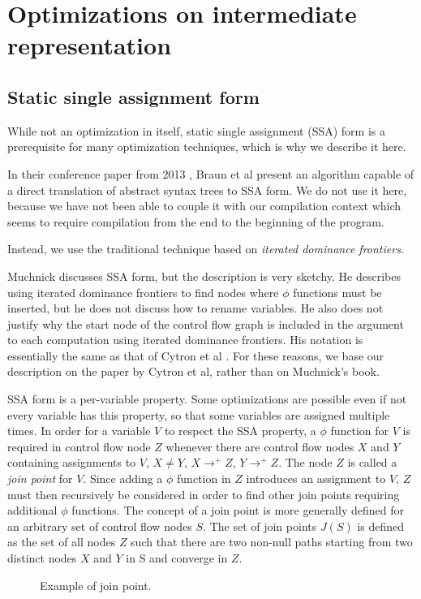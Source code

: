 \chapter{Optimizations on intermediate representation}

\section{Static single assignment form}

While not an optimization in itself, static single assignment (SSA)
form is a prerequisite for many optimization techniques, which is why
we describe it here. 

In their conference paper from 2013
\cite{Braun:2013:SEC:2450247.2450258}, Braun et al present an
algorithm capable of a direct translation of abstract syntax trees to
SSA form.  We do not use it here, because we have not been able to
couple it with our compilation context which seems to require
compilation from the end to the beginning of the program. 

Instead, we use the traditional technique based on \emph{iterated
  dominance frontiers}.

Muchnick \cite{Muchnick:1998:ACD:286076} discusses SSA form, but the
description is very sketchy.  He describes using iterated dominance
frontiers to find nodes where $\phi$ functions must be inserted, but
he does not discuss how to rename variables.  He also does not justify
why the start node of the control flow graph is included in the
argument to each computation using iterated dominance frontiers.  His
notation is essentially the same as that of Cytron et al
\cite{Cytron:1991:ECS:115372.115320}.  For these reasons, we base our
description on the paper by Cytron et al, rather than on Muchnick's
book.

SSA form is a per-variable property.  Some optimizations are possible
even if not every variable has this property, so that some variables
are assigned multiple times.  In order for a variable $V$ to respect
the SSA property, a $\phi$ function for $V$ is required in control
flow node $Z$ whenever there are control flow nodes $X$ and $Y$
containing assignments to $V$, $X \ne Y$, $X \rightarrow^+ Z$, $Y
\rightarrow^+ Z$.  The node $Z$ is called a \emph{join point} for $V$.
Since adding a $\phi$ function in $Z$ introduces an assignment to $V$,
$Z$ must then recursively be considered in order to find other join
points requiring additional $\phi$ functions.  The concept of a join
point is more generally defined for an arbitrary set of control flow
nodes $S$.  The set of join points $J(S)$ is defined as the set of all
nodes $Z$ such that there are two non-null paths starting from two
distinct nodes $X$ and $Y$ in S and converge in $Z$. 

\begin{figure}
\begin{center}
\end{center}
\caption{\label{fig-ssa-join-1}
Example of join point.}
\end{figure}

